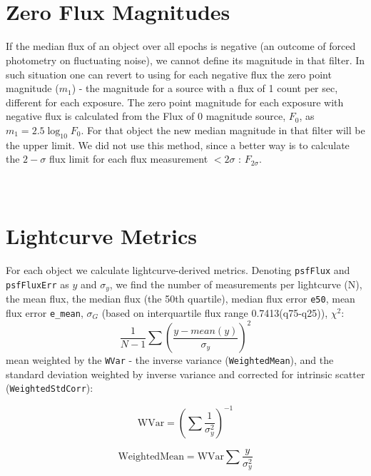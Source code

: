 \documentclass[fleqn,usenatbib]{mnras}  %
\begin{document}
\section{\\ Zero Flux Magnitudes }
\label{sec:zero_flux}

If the median flux of an object over all epochs  is negative (an outcome of forced photometry on fluctuating noise), we cannot define its magnitude in that filter.  In such situation one can revert to  using for each negative flux the zero point magnitude ($m_1$) - the magnitude for a source with a flux of 1 count per sec, different for each exposure.  The zero point magnitude for each exposure with negative flux is calculated from the  Flux of 0 magnitude source,  $F_0$,  as  $m_{1} = 2.5 \log_{10}{F_{0}}$. For that object the new median magnitude in that filter will be the upper limit. We did not use this method, since a better way is to calculate the $2-\sigma$ flux limit for each flux measurement $< 2 \sigma$ : $F_{2\sigma}$. 

\section{\\ Lightcurve Metrics}
\label{sec:lc_metrics}

For each object we calculate lightcurve-derived metrics. Denoting \verb|psfFlux| and \verb|psfFluxErr| as $y$ and $\sigma_{y}$, we find the number of measurements per lightcurve (N), the mean flux, the median flux (the 50th quartile), median flux error \verb|e50|, mean flux error \verb|e_mean|, $\sigma_{G}$ (based on interquartile flux range 0.7413(q75-q25)), $\chi^{2}$:
\begin{equation}
\frac{1}{N-1} \sum{\left( \frac{y-mean(y)}{\sigma_{y}} \right) ^{2}}
\end{equation}
 mean weighted by the \verb|WVar| - the inverse variance (\verb|WeightedMean|), and the standard deviation weighted by inverse variance and corrected for intrinsic scatter (\verb|WeightedStdCorr|):

\begin{equation}
\mbox{WVar} = \left( \sum{\frac{1}{\sigma_{y}^{2}}} \right) ^{-1}
\end{equation} 

\begin{equation}
\mbox{WeightedMean} = \mbox{WVar} \sum{\frac{y}{\sigma_{y}^{2}}}
\end{equation}
\end{document}
